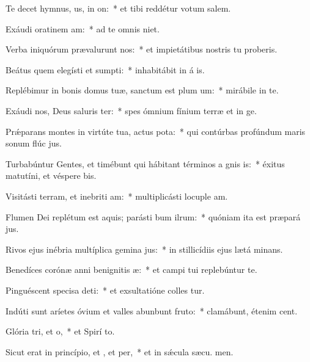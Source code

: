 \item Te decet hymnus, us, in on:~* et tibi reddétur votum  salem.
\item Exáudi oratinem am:~* ad te omnis  niet.
\item Verba iniquórum prævalurunt  nos:~* et impietátibus nostris tu proberis.
\item Beátus quem elegísti et sumpti:~* inhabitábit in á is.
\item Replébimur in bonis domus tuæ, sanctum est plum um:~* mirábile in te.
\item Exáudi nos, Deus saluris ter:~* spes ómnium fínium terræ et in  ge.
\item Prǽparans montes in virtúte tua, actus pota:~* qui contúrbas profúndum maris sonum flúc jus.
\item Turbabúntur Gentes, et timébunt qui hábitant términos a gnis is:~* éxitus matutíni, et véspere bis.
\item Visitásti terram, et inebriti am:~* multiplicásti locuple am.
\item Flumen Dei replétum est aquis; parásti bum ilrum:~* quóniam ita est præpará jus.
\item Rivos ejus inébria multíplica gemina jus:~* in stillicídiis ejus lætá minans.
\item Benedíces corónæ anni benignitis æ:~* et campi tui replebúntur te.
\item Pinguéscent specisa deti:~* et exsultatióne colles tur.
\item Indúti sunt aríetes óvium et valles abunbunt fruto:~* clamábunt, étenim  cent.
\item Glória tri, et o,~* et Spirí to.
\item Sicut erat in princípio, et , et per,~* et in sǽcula sæcu. men.
